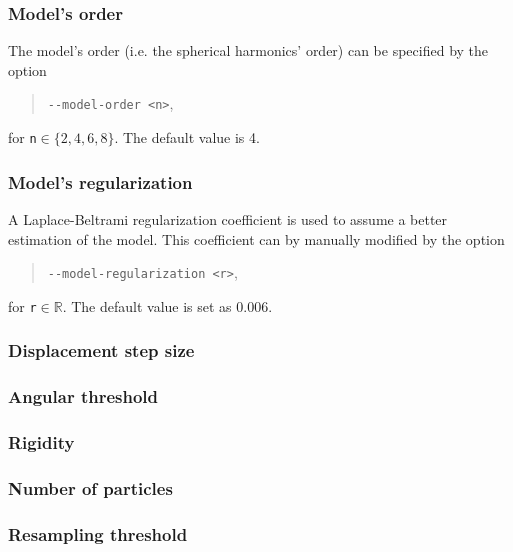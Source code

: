     \subsubsection*{Model's order}
        The model's order (i.e. the spherical harmonics' order) can be specified by the option
            \begin{quote}
                \texttt{-\hspace{0.1mm}-model-order <n>},
            \end{quote}
        for \texttt{n}$\in\{2,4,6,8\}$. The default value is 4.

    \subsubsection*{Model's regularization}
        A Laplace-Beltrami regularization coefficient is used to assume a better estimation of the model. This coefficient can by manually modified by the option
            \begin{quote}
                \texttt{-\hspace{0.1mm}-model-regularization <r>},
            \end{quote}
        for \texttt{r}$\in\mathbb{R}$. The default value is set as 0.006.

    \subsubsection*{Displacement step size}


    \subsubsection*{Angular threshold}

    \subsubsection*{Rigidity}

    \subsubsection*{Number of particles}

    \subsubsection*{Resampling threshold}



